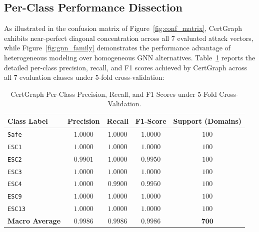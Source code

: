 \subsection{Per-Class Performance Dissection}
As illustrated in the confusion matrix of Figure~\ref{fig:conf_matrix}, CertGraph exhibits near-perfect diagonal concentration across all 7 evaluated attack vectors, while Figure~\ref{fig:gnn_family} demonstrates the performance advantage of heterogeneous modeling over homogeneous GNN alternatives. Table~\ref{tab:per_class} reports the detailed per-class precision, recall, and F1 scores achieved by CertGraph across all 7 evaluation classes under 5-fold cross-validation:

\begin{table}[ht]
\centering
\small
\caption{CertGraph Per-Class Precision, Recall, and F1 Scores under 5-Fold Cross-Validation.}
\label{tab:per_class}
\begin{tabular}{lcccc}
\toprule
\textbf{Class Label} & \textbf{Precision} & \textbf{Recall} & \textbf{F1-Score} & \textbf{Support (Domains)} \\
\midrule
\texttt{Safe} & $1.0000$ & $1.0000$ & $1.0000$ & $100$ \\
\texttt{ESC1} & $1.0000$ & $1.0000$ & $1.0000$ & $100$ \\
\texttt{ESC2} & $0.9901$ & $1.0000$ & $0.9950$ & $100$ \\
\texttt{ESC3} & $1.0000$ & $1.0000$ & $1.0000$ & $100$ \\
\texttt{ESC4} & $1.0000$ & $0.9900$ & $0.9950$ & $100$ \\
\texttt{ESC9} & $1.0000$ & $1.0000$ & $1.0000$ & $100$ \\
\texttt{ESC13} & $1.0000$ & $1.0000$ & $1.0000$ & $100$ \\
\midrule
\textbf{Macro Average} & $\mathbf{0.9986}$ & $\mathbf{0.9986}$ & $\mathbf{0.9986}$ & $\mathbf{700}$ \\
\bottomrule
\end{tabular}
\end{table}

